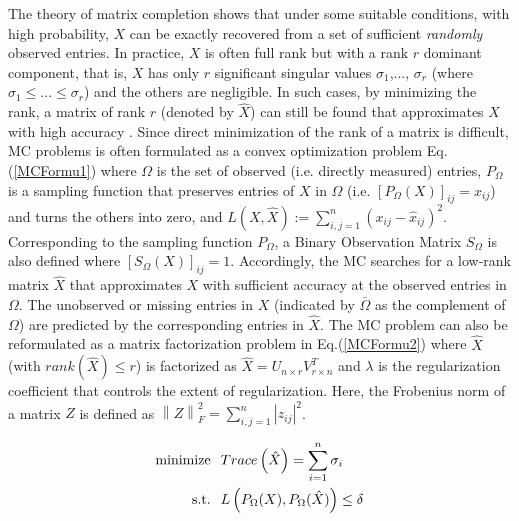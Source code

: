 The theory of matrix completion \cite{Candes:2009} shows that under some suitable conditions, with high probability, $X$ can be exactly recovered from a set of sufficient \emph{randomly} observed entries. In practice, $X$ is often full rank but
with a rank $r$ dominant component, that is, $X$ has only $r$ significant singular values $\sigma_{1}$,..., $\sigma_{r}$ (where $\sigma_{1} \leq ... \leq \sigma_{r}$) and the others are negligible. In such cases, by minimizing the rank, a matrix of rank $r$ (denoted by $\hat{X}$) can still be found that approximates $X$ with high accuracy \cite{YLiao:2011}\cite{Candes:2009}\cite{Keshavan:2009}. Since direct minimization of the rank of a matrix is difficult, MC problems is often formulated as a convex optimization problem Eq.(\ref{MCFormu1}) where $\Omega$ is the set of observed (i.e. directly measured) entries, $P_{\Omega}$ is a sampling function that preserves entries of $X$ in $\Omega$ (i.e. $[P_{\Omega}(X)]_{ij}=x_{ij}$) and turns the others into zero, and $L(X,\hat{X}):=\sum_{i,j=1}^{n} (x_{ij}-\hat{x}_{ij})^{2}$. Corresponding to the sampling function $P_{\Omega}$, a Binary Observation Matrix $S_{\Omega}$ is also defined where $[S_{\Omega}(X)]_{ij}=1$. Accordingly, the MC searches for a low-rank matrix $\hat{X}$ that approximates $X$ with sufficient accuracy at the observed entries in $\Omega$. The unobserved or missing entries in $X$ (indicated by $\bar{\Omega}$ as the complement of $\Omega$) are predicted by the corresponding entries in $\hat{X}$. The MC problem can also be reformulated as a matrix factorization problem in Eq.(\ref{MCFormu2}) where $\hat{X}$ (with $rank(\hat{X}) \leq r$) is factorized as $\hat{X}=U_{n \times r}V_{r \times n}^{T}$ and $\lambda$ is the regularization coefficient that controls the extent of regularization. Here, the Frobenius norm of a matrix $Z$ is defined as $\left\|Z\right\|_{F}^{2}=\sum_{i,j=1}^{n} \left|z_{ij}\right|^{2}$. 

\begin{equation}\label{MCFormu1}
\begin{aligned}
\text{minimize} & \hspace{0.25cm} Trace \left( \hat{X} \right) = \sum_{i=1}^{n} \sigma_{i} \\
\text{s.t.} &  \hspace{0.25cm}  L\left(P_{\Omega}(X),P_{\Omega}(\hat{X})\right) \leq \delta
\end{aligned}
\end{equation}


